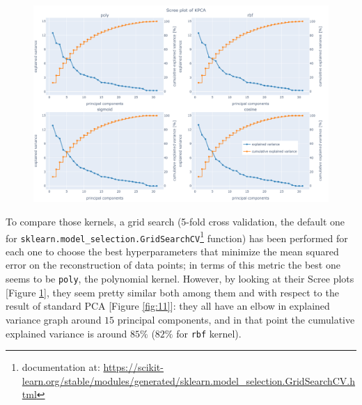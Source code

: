 \documentclass[letterpaper]{article}
\begin{document}
	\begin{figure}[h]
		\centering
		\includegraphics[width=.9\textwidth]{images/scree_plot_kpca.png}
		\label{fig:14}
	\end{figure}
	To compare those kernels, a grid search (5-fold cross validation, the default one for \texttt{sklearn.model\_selection.GridSearchCV}\footnote{documentation at: \url{https://scikit-learn.org/stable/modules/generated/sklearn.model_selection.GridSearchCV.html}} function) has been performed for each one to choose the best hyperparameters that minimize the mean squared error on the reconstruction of data points; in terms of this metric the best one seems to be \texttt{poly}, the polynomial kernel. However, by looking at their Scree plots [Figure \ref{fig:14}], they seem pretty similar both among them and with respect to the result of standard PCA [Figure \ref{fig:11}]: they all have an elbow in explained variance graph around $15$ principal components, and in that point the cumulative explained variance is around $85\%$ ($82\%$ for \texttt{rbf} kernel).
	
\end{document}
